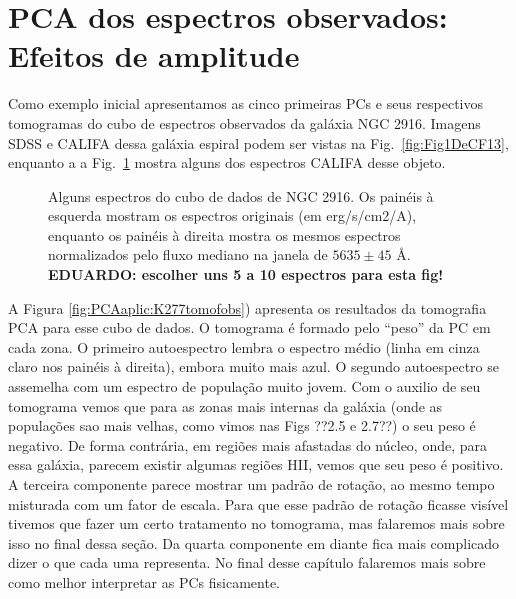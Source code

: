 \section{PCA dos espectros observados: Efeitos de amplitude}
\label{sec:PCAaplic:norm}

Como exemplo inicial apresentamos as cinco primeiras PCs e seus respectivos tomogramas do cubo de espectros observados
da galáxia NGC 2916. Imagens SDSS e CALIFA dessa galáxia espiral podem ser vistas na Fig.\ \ref{fig:Fig1DeCF13}, enquanto a 
a Fig.\ \ref{fig:PCAaplic:K277ExampleSpectra} mostra alguns dos espectros CALIFA desse objeto. 


\begin{figure}
    \caption[\ojo!]
    {Alguns espectros do cubo de dados de NGC 2916. Os painéis à esquerda mostram os espectros originais (em erg/s/cm2/A), enquanto os painéis à direita mostra os mesmos espectros normalizados pelo fluxo mediano na janela de $5635 \pm 45$ \AA. {\bf\ojo EDUARDO: escolher uns 5 a 10 espectros para esta fig!}}
    \label{fig:PCAaplic:K277ExampleSpectra}
\end{figure}


A Figura \ref{fig:PCAaplic:K277tomofobs}) apresenta os resultados da tomografia PCA para esse cubo de dados. O tomograma é formado pelo ``peso'' da PC em cada zona. O primeiro autoespectro
lembra o espectro médio (linha em cinza claro nos painéis à direita), embora muito mais azul.
 O segundo autoespectro se assemelha com um espectro de população muito jovem. Com o auxilio de seu
tomograma vemos que para as zonas mais internas da galáxia (onde as populações sao mais velhas, como vimos nas Figs ??2.5 e 2.7??) o seu peso é negativo. De forma contrária, em regiões mais afastadas do núcleo, 
onde, para essa galáxia, parecem existir algumas regiões HII, vemos que seu peso é positivo. A terceira componente
parece mostrar um padrão de rotação, ao mesmo tempo misturada com um fator de escala. Para que esse padrão de rotação
ficasse visível tivemos que fazer um certo tratamento no tomograma, mas falaremos mais sobre isso no final dessa seção.
Da quarta componente em diante fica mais complicado dizer o que cada uma representa. No final desse capítulo falaremos mais sobre como melhor interpretar as PCs fisicamente.

